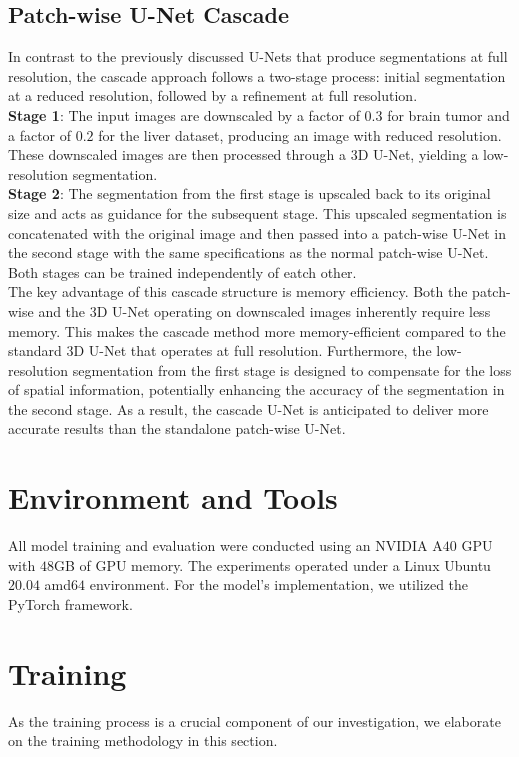 \subsection{Patch-wise U-Net Cascade}
In contrast to the previously discussed U-Nets that produce segmentations at full resolution, the cascade approach follows a two-stage process:
initial segmentation at a reduced resolution, followed by a refinement at full resolution.\\[1ex]
\textbf{Stage 1}:
The input images are downscaled by a factor of $0.3$ for brain tumor and a factor of $0.2$ for the liver dataset, producing an image with reduced resolution. These downscaled images are then processed through a $3$D U-Net,
yielding a low-resolution segmentation.\\[1ex]
\textbf{Stage 2}:
The segmentation from the first stage is upscaled back to its original size and acts as guidance for the subsequent stage.
This upscaled segmentation is concatenated with the original image and then passed into a patch-wise U-Net in the second stage with the same specifications as the normal patch-wise U-Net.
Both stages can be trained independently of eatch other.\\

\noindent The key advantage of this cascade structure is memory efficiency. Both the patch-wise and the $3$D U-Net operating on downscaled images inherently require less memory.
This makes the cascade method more memory-efficient compared to the standard $3$D U-Net that operates at full resolution. Furthermore,
the low-resolution segmentation from the first stage is designed to compensate for the loss of spatial information, potentially enhancing the accuracy of the segmentation in the second stage.
As a result, the cascade U-Net is anticipated to deliver more accurate results than the standalone patch-wise U-Net.

\section{Environment and Tools}
All model training and evaluation were conducted using an NVIDIA A$40$ GPU with $48$GB of GPU memory. The experiments operated under a Linux Ubuntu $20.04$ amd$64$ environment. For the model's implementation,
we utilized the PyTorch framework.

\section{Training}
As the training process is a crucial component of our investigation, we elaborate on the training methodology in this section.
